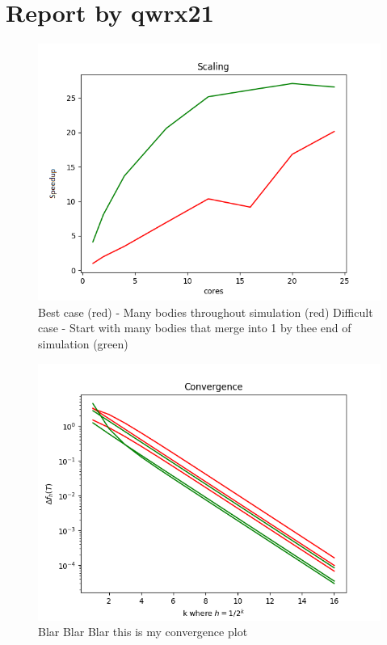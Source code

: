 \documentclass{article}
\begin{document}
\section*{Report by qwrx21}

\begin{figure}[h!]
  \includegraphics[scale=1]{scaling.png}
  \caption{Best case (red) - Many bodies throughout simulation (red) Difficult case - Start with many bodies that merge into 1 by thee end of simulation (green)}
  \label{fig:scaling}
\end{figure}

\begin{figure}[h!]
    \includegraphics[scale=1]{convergence.png}
    \caption{Blar Blar Blar this is my convergence plot}
    \label{fig:convergence}
  \end{figure}

 
\end{document}
